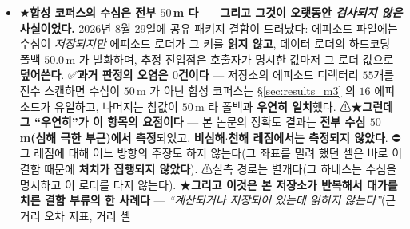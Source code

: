 \documentclass[11pt]{report}
\numberwithin{equation}{chapter}
\numberwithin{figure}{chapter}
\numberwithin{table}{chapter}
\begin{document}
\begin{itemize}
        단일 검정 문턱에는 닿고 가족단위 문턱은 넘지 못한 것이 이 상한의 직접적 결과다.
        ★\textbf{그리고 그것은 자료의 성질이 아니라 설계의 성질이다} --- $n = 12$ 에서
        가족단위 첫 유의수준 $0.05/6$ 아래로 갈 수 있는 부호검정 결과는 $11/12$ 와 $12/12$
        \textbf{뿐}이므로, $10/12$ 크기의 고리는 \textbf{어떤 자료에서도} 기각되지 않는다
        ⟹ ⛔\textbf{그 널을 ``격차가 인수분해되지 않는다''로 읽지 않는다.}
        ⟹ \textbf{제\ref{chap:wavesplat}장 소거표에 남아 있는 축 가운데
        ``사이트 기하와 레코드 구성''의 답은 새 측정이 아니라 이 문장이다}: 그 축을
        재려면 자료 자체를 늘려야 하고, 그것은 본 논문의 범위 밖이다.
        ⚠\textbf{같은 이유로 사이트 수준 일반화를 하지 않는다}(사이트가 $4$곳뿐이라
        사이트 단위 부호검정의 최소 달성 유의확률이 $0.0625$ 다).
  \item ★\textbf{합성 코퍼스의 수심은 전부 $50$\,m 다 --- 그리고 그것이 오랫동안
        \emph{검사되지 않은} 사실이었다.} 2026년 8월 29일에 공유 패키지 결함이 드러났다:
        에피소드 파일에는 수심이 \emph{저장되지만} 에피소드 로더가 그 키를 \textbf{읽지
        않고}, 데이터 로더의 하드코딩 폴백 $50.0$\,m 가 발화하며, 추정 진입점은 호출자가
        명시한 값마저 그 로더 값으로 \textbf{덮어쓴다}. ✅\textbf{과거 판정의 오염은
        $0$건이다} --- 저장소의 에피소드 디렉터리 $55$개를 전수 스캔하면 수심이 $50$\,m 가
        아닌 합성 코퍼스는 \S\ref{sec:results_m3} 의 $16$ 에피소드가 유일하고, 나머지는
        참값이 $50$\,m 라 폴백과 \textbf{우연히 일치}했다. ⚠★\textbf{그런데 그
        ``우연히''가 이 항목의 요점이다} --- 본 논문의 정확도 결과는 \textbf{전부 수심
        $50$\,m(심해 극한 부근)에서 측정}되었고, \textbf{비심해$\cdot$천해 레짐에서는
        측정되지 않았다}. ⛔그 레짐에 대해 어느 방향의 주장도 하지 않는다(그 좌표를 밀려
        했던 셀은 바로 이 결함 때문에 \textbf{처치가 집행되지 않았다}).
        ⚠실측 경로는 별개다(그 하네스는 수심을 명시하고 이 로더를 타지 않는다).
        ★\textbf{그리고 이것은 본 저장소가 반복해서 대가를 치른 결함 부류의 한 사례다} ---
        \emph{``계산되거나 저장되어 있는데 읽히지 않는다''}(근거리 오차 지표, 거리 셸

\end{itemize}
\end{document}
